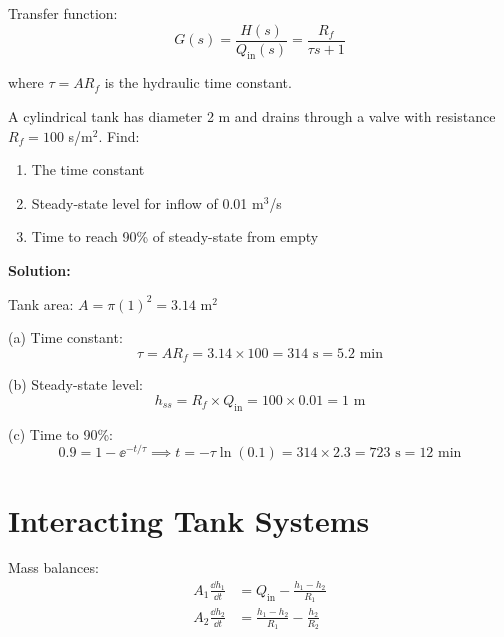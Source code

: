 Transfer function:
\begin{equation}
G(s) = \frac{H(s)}{Q_{\text{in}}(s)} = \frac{R_f}{\tau s + 1}
\end{equation}

where $\tau = AR_f$ is the hydraulic time constant.

\begin{examplebox}[title=Example 1.11: Water Tank]
A cylindrical tank has diameter 2 m and drains through a valve with resistance $R_f = 100$ s/m$^2$. Find:
\begin{enumerate}[label=(\alph*)]
    \item The time constant
    \item Steady-state level for inflow of 0.01 m$^3$/s
    \item Time to reach 90\% of steady-state from empty
\end{enumerate}

\textbf{Solution:}

Tank area: $A = \pi(1)^2 = 3.14$ m$^2$

(a) Time constant:
\begin{equation}
\tau = AR_f = 3.14 \times 100 = 314 \text{ s} = 5.2 \text{ min}
\end{equation}

(b) Steady-state level:
\begin{equation}
h_{ss} = R_f \times Q_{\text{in}} = 100 \times 0.01 = 1 \text{ m}
\end{equation}

(c) Time to 90\%:
\begin{equation}
0.9 = 1 - \ee^{-t/\tau} \implies t = -\tau\ln(0.1) = 314 \times 2.3 = 723 \text{ s} = 12 \text{ min}
\end{equation}
\end{examplebox}

\section{Interacting Tank Systems}
\label{sec:interacting_tanks}



Mass balances:
\begin{align}
A_1\frac{\dd h_1}{\dd t} &= Q_{\text{in}} - \frac{h_1 - h_2}{R_1} \\
A_2\frac{\dd h_2}{\dd t} &= \frac{h_1 - h_2}{R_1} - \frac{h_2}{R_2}
\end{align}

